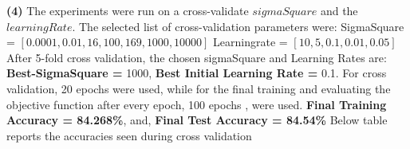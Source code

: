 \documentclass{article}
\renewcommand\part[1]{\vspace{.10in}\textbf{(#1)}}
\begin{document}
   \part{4} The experiments were run on a cross-validate $sigmaSquare$ and the $learningRate$. The selected list of cross-validation parameters were: \newline
   SigmaSquare  = $[0.0001, 0.01, 16, 100 , 169, 1000, 10000]$ \newline
   Learningrate = $[10, 5, 0.1, 0.01, 0.05]$ \newline
   After 5-fold cross validation, the chosen sigmaSquare and Learning Rates are:
   \textbf {Best-SigmaSquare = } 1000, \textbf {Best Initial Learning Rate = } 0.1. \newline
   For cross validation, 20 epochs were used, while for the final training and evaluating the objective function after every epoch, 100 epochs , were used. \newline
   \textbf {Final Training Accuracy = 84.268\%}, and, \textbf {Final Test Accuracy = 84.54\%} \newline
   Below table reports the accuracies seen during cross validation
\end{document}
